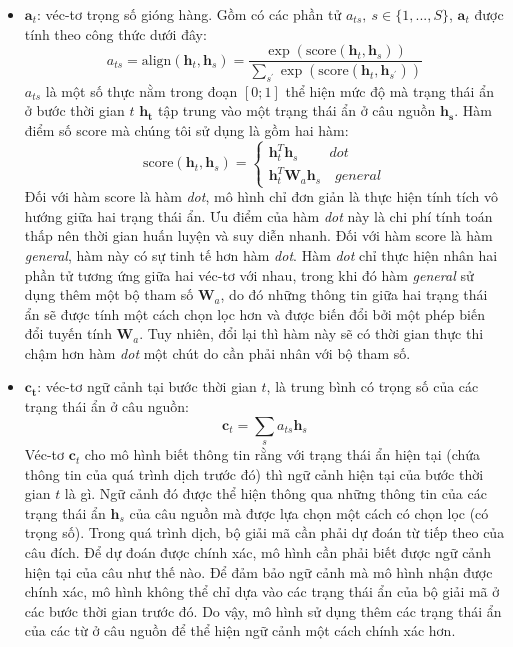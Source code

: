 \begin{itemize}
	\item $\bm{a}_t$: véc-tơ trọng số gióng hàng. Gồm có các phần tử $a_{ts},\ s \in \{1, ..., S\}$, $\bm{a}_t$ được tính theo công thức dưới đây:
	\begin{equation}
	a_{ts} = \text{align}(\bm{h}_t, \bm{h}_s) = \frac{\exp\left(\text{score}(\bm{h}_t, \bm{h}_s)\right)}{\sum_{s^{'}}\exp\left(\text{score}(\bm{h}_t, \bm{h}_{s^{'}})\right)}
	\end{equation}
	$a_{ts}$ là một số thực nằm trong đoạn $[0;1]$ thể hiện mức độ mà trạng thái ẩn ở bước thời gian $t$ $\bm{h_t}$ tập trung vào một trạng thái ẩn ở câu nguồn $\bm{h_s}$. Hàm điểm số score mà chúng tôi sử dụng là gồm hai hàm:
	\begin{equation}
	\text{score}(\bm{h}_t, \bm{h}_s) = \left\{
			\begin{array}{ll}
			\bm{h}^T_t \bm{h}_s \ \quad\quad dot\\
			\bm{h}^T_t \bm{W}_a \bm{h}_s	\quad general
			\end{array}
		\right.
	\end{equation}
	Đối với hàm score là hàm \textit{dot}, mô hình chỉ đơn giản là thực hiện tính tích vô hướng giữa hai trạng thái ẩn. Ưu điểm của hàm \textit{dot} này là chi phí tính toán thấp nên thời gian huấn luyện và suy diễn nhanh.
	Đối với hàm score là hàm \textit{general}, hàm này có sự tinh tế hơn hàm \textit{dot}. Hàm \textit{dot} chỉ thực hiện nhân hai phần tử tương ứng giữa hai véc-tơ với nhau, trong khi đó hàm \textit{general} sử dụng thêm một bộ tham số $\bm{W}_a$, do đó những thông tin giữa hai trạng thái ẩn sẽ được tính một cách chọn lọc hơn và được biến đổi bởi một phép biến đổi tuyến tính $\bm{W}_a$. Tuy nhiên, đổi lại thì hàm này sẽ có thời gian thực thi chậm hơn hàm \textit{dot} một chút do cần phải nhân với bộ tham số.
	\item $\bm{c_t}$: véc-tơ ngữ cảnh tại bước thời gian $t$, là trung bình có trọng số của các trạng thái ẩn ở câu nguồn:
	\begin{equation}
	\bm{c}_t = \sum_{s}a_{ts}\bm{h}_s
	\end{equation}
	Véc-tơ $\bm{c}_t$ cho mô hình biết thông tin rằng với trạng thái ẩn hiện tại (chứa thông tin của quá trình dịch trước đó) thì ngữ cảnh hiện tại của bước thời gian $t$ là gì. Ngữ cảnh đó được thể hiện thông qua những thông tin của các trạng thái ẩn $\bm{h}_s$ của câu nguồn mà được lựa chọn một cách có chọn lọc (có trọng số). Trong quá trình dịch, bộ giải mã cần phải dự đoán từ tiếp theo của câu đích. Để dự đoán được chính xác, mô hình cần phải biết được ngữ cảnh hiện tại của câu như thế nào. Để đảm bảo ngữ cảnh mà mô hình nhận được chính xác, mô hình không thể chỉ dựa vào các trạng thái ẩn của bộ giải mã ở các bước thời gian trước đó. Do vậy, mô hình sử dụng thêm các trạng thái ẩn của các từ ở câu nguồn để thể hiện ngữ cảnh một cách chính xác hơn.

\end{itemize}
